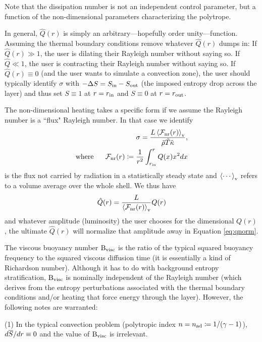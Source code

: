 \documentclass[12pt]{article}
\numberwithin{equation}{section}
\newcommand{\nad}{n_{\rm{ad}}}
\begin{document}
Note that the dissipation number is not an independent control parameter, but a function of the non-dimensional parameters characterizing the polytrope. 

In general, $\hat{Q}(r)$ is simply an arbitrary---hopefully order unity---function. Assuming the thermal boundary conditions remove whatever $\hat{Q}(r)$ dumps in: If $\hat{Q}(r)\gg1$, the user is dilating their Rayleigh number without saying so. If $\hat{Q}\ll1$, the user is contracting their Rayleigh number without saying so. If $\hat{Q}(r)\equiv0$ (and the user wants to simulate a convection zone), the user should typically identify $\sigma$ with $-\Delta S=S_{\rm{in}}-S_{\rm{out}}$ (the imposed entropy drop across the layer) and thus set $S\equiv1$ at $r=r_{\rm{in}}$ and $S\equiv0$ at $r=r_{\rm{out}}$.
 
The non-dimensional heating takes a specific form if we assume the Rayleigh number is a ``flux" Rayleigh number. In that case we identify
\begin{align}
	\sigma = \frac{L \left\langle{\mathcal{F}}_{\rm{nr}}(r)\right\rangle_{\rm{v}}}{\tilde{\rho}\tilde{T}\tilde{\kappa}},\\
	\text{where}\ \ \ \ \  {\mathcal{F}}_{\rm{nr}}(r) \coloneqq \frac{1}{r^2}\int_{r_{\rm{in}}}^r Q(x) x^2 dx
\end{align}
is the flux not carried by radiation in a statistically steady state and $\left\langle\cdots\right\rangle_{\rm{v}}$ refers to a volume average over the whole shell. We thus have
\begin{align}\label{eq:qnorm}
	\hat{Q}(r) = \frac{L}{\left\langle{\mathcal{F}}_{\rm{nr}}(r)\right\rangle_{\rm{v}}}Q(r)
\end{align}
and whatever amplitude (luminosity) the user chooses for the dimensional $Q(r)$, the ultimate $\hat{Q}(r)$ will normalize that amplitude away in Equation \eqref{eq:qnorm}. 

The viscous buoyancy number ${\rm{B_{visc}}}$ is the ratio of the typical squared buoyancy frequency to the squared viscous diffusion time (it is essentially a kind of Richardson number). Although it has to do with background entropy stratification, ${\rm{B_{visc}}}$ is nominally independent of the Rayleigh number (which derives from the entropy perturbations associated with the thermal boundary conditions and/or heating that force energy through the layer). However, the following notes are warranted: 

(1) In the typical convection problem (polytropic index $n=\nad\define1/(\gamma-1)$), $d\overline{S}/dr\equiv0$ and the value of ${\rm{B_{visc}}}$ is irrelevant. 
\end{document}
